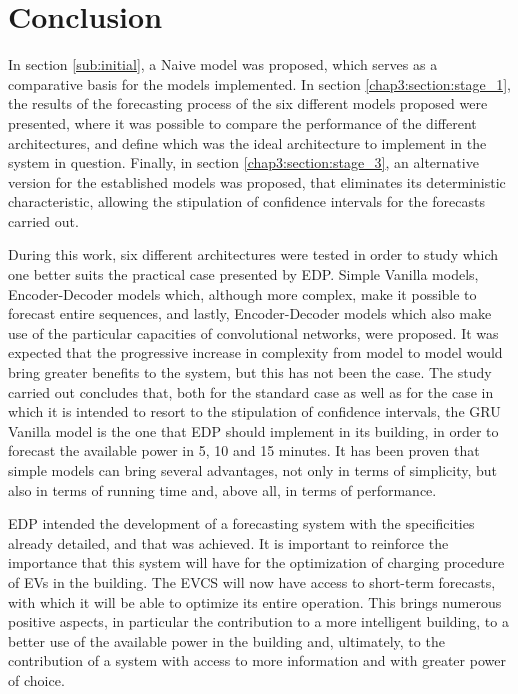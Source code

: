 \section{Conclusion}

In section \ref{sub:initial}, a Naive model was proposed, which serves as a comparative basis for the models implemented. In section \ref{chap3:section:stage_1}, the results of the forecasting process of the six different models proposed were presented, where it was possible to compare the performance of the different architectures, and define which was the ideal architecture to implement in the system in question. Finally, in section \ref{chap3:section:stage_3}, an alternative version for the established models was proposed, that eliminates its deterministic characteristic, allowing the stipulation of confidence intervals for the forecasts carried out.

During this work, six different architectures were tested in order to study which one better suits the practical case presented by \ac{EDP}. Simple Vanilla models, Encoder-Decoder models which, although more complex, make it possible to forecast entire sequences, and lastly, Encoder-Decoder models which also make use of the particular capacities of convolutional networks, were proposed. It was expected that the progressive increase in complexity from model to model would bring greater benefits to the system, but this has not been the case. The study carried out concludes that, both for the standard case as well as for the case in which it is intended to resort to the stipulation of confidence intervals, the \ac{GRU} Vanilla model is the one that EDP should implement in its building, in order to forecast the available power in 5, 10 and 15 minutes. It has been proven that simple models can bring several advantages, not only in terms of simplicity, but also in terms of running time and, above all, in terms of performance.

\ac{EDP} intended the development of a forecasting system with the specificities already detailed, and that was achieved. It is important to reinforce the importance that this system will have for the optimization of charging procedure of \ac{EV}s in the building. The \ac{EVCS} will now have access to short-term forecasts, with which it will be able to optimize its entire operation.
This brings numerous positive aspects, in particular the contribution to a more intelligent building, to a better use of the available power in the building and, ultimately, to the contribution of a system with access to more information and with greater power of choice.

